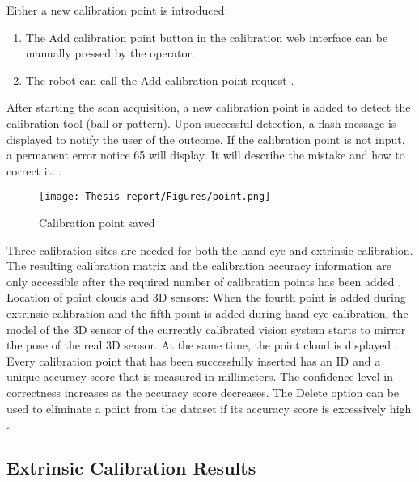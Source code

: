 \documentclass[12pt]{article}
\begin{document}
Either a new calibration point is introduced:
\begin{enumerate}
    \item The Add calibration point button in the calibration web interface can be manually pressed by the operator\cite{ref2}.
    \item The robot can call the Add calibration point request \cite{ref2}.
\end{enumerate}

After starting the scan acquisition, a new calibration point is added to detect the calibration tool (ball or pattern).  Upon successful detection, a flash message is displayed to notify the user of the outcome.  If the calibration point is not input, a permanent error notice 65 will display. It will describe the mistake and how to correct it. \cite{ref2}.

\begin{figure}[h]
    \centering
    \texttt{[image: Thesis-report/Figures/point.png]}
    \caption{Calibration point saved \cite{ref2}}
    \label{fig:Photoneo Cmaera}
\end{figure} 

Three calibration sites are needed for both the hand-eye and extrinsic calibration. The resulting calibration matrix and the calibration accuracy information are only accessible after the required number of calibration points has been added \cite{ref2}.\\
 
 Location of point clouds and 3D sensors: When the fourth point is added during extrinsic calibration and the fifth point is added during hand-eye calibration, the model of the 3D sensor of the currently calibrated vision system starts to mirror the pose of the real 3D sensor.  At the same time, the point cloud is displayed \cite{ref2}.\\
 Every calibration point that has been successfully inserted has an ID and a unique accuracy score that is measured in millimeters.  The confidence level in correctness increases as the accuracy score decreases.  The Delete option can be used to eliminate a point from the dataset if its accuracy score is excessively high \cite{ref2}.

\subsection{Extrinsic Calibration Results}
\begin{table}[h!]
\centering


\label{tab:transformation_matrix}
\caption{Calibration Results}
\end{table}
\end{document}
